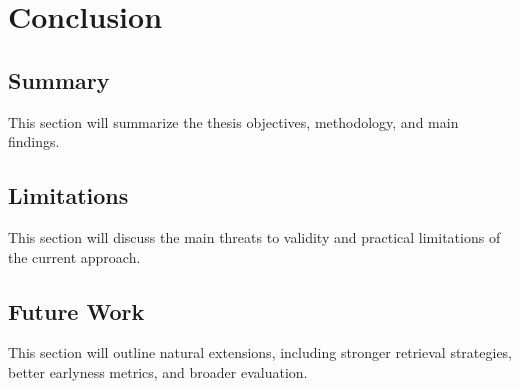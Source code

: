 \chapter{Conclusion}

\section{Summary}
This section will summarize the thesis objectives, methodology, and main findings.

\section{Limitations}
This section will discuss the main threats to validity and practical limitations of the current approach.

\section{Future Work}
This section will outline natural extensions, including stronger retrieval strategies, better earlyness metrics, and broader evaluation.

\blankpage
